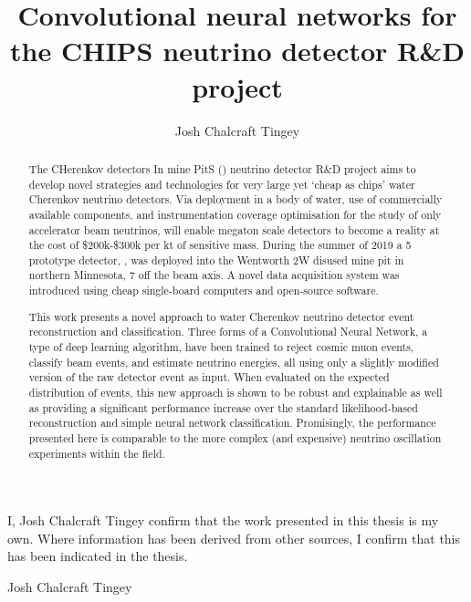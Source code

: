 
\title{Convolutional neural networks for the CHIPS neutrino detector R\&D project}
\author{Josh Chalcraft Tingey}

\thispagestyle{plain}

\begin{declaration} %
    I, Josh Chalcraft Tingey confirm that the work presented in this thesis is my own. Where
    information has been derived from other sources, I confirm that this has been indicated in the
    thesis.
    \vspace*{1cm}
    \begin{flushright}
        Josh Chalcraft Tingey
    \end{flushright}
\end{declaration}

\begin{abstract} %
    The CHerenkov detectors In mine PitS (\chips) neutrino detector R\&D project aims to develop
    novel strategies and technologies for very large yet `cheap as chips' water Cherenkov neutrino
    detectors. Via deployment in a body of water, use of commercially available components, and
    instrumentation coverage optimisation for the study of only accelerator beam neutrinos, \chips
    will enable megaton scale detectors to become a reality at the cost of \$200k-\$300k per kt of
    sensitive mass. During the summer of 2019 a \SI{5}{} prototype \chips detector,
    \chipsfive, was deployed into the Wentworth 2W disused mine pit in northern Minnesota,
    \SI{7}{} off the \numi beam axis. A novel data acquisition system was introduced
    using cheap single-board computers and open-source software.

    This work presents a novel approach to water Cherenkov neutrino detector event reconstruction
    and classification. Three forms of a Convolutional Neural Network, a type of deep learning
    algorithm, have been trained to reject cosmic muon events, classify beam events, and estimate
    neutrino energies, all using only a slightly modified version of the raw detector event as
    input. When evaluated on the expected distribution of \chipsfive events, this new approach is
    shown to be robust and explainable as well as providing a significant performance increase
    over the standard likelihood-based reconstruction and simple neural network classification.
    Promisingly, the performance presented here is comparable to the more complex (and expensive)
    neutrino oscillation experiments within the field.
\end{abstract}

